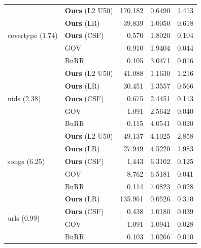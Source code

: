 \begin{tabular}{ll rrr}
  \midrule\multirow{5}{*}{covertype (1.74)} & \textbf{Ours} (L2 U50) & 170.182 & 0.6490 & 1.413 \\
                                            &     \textbf{Ours} (LR) &  39.839 & 1.0050 & 0.618 \\
                                            &    \textbf{Ours} (CSF) &   0.570 & 1.8020 & 0.104 \\
                                            &                    GOV &   0.910 & 1.9404 & 0.044 \\
                                            &                   BuRR &   0.105 & 3.0471 & 0.016 \\
       \midrule\multirow{5}{*}{nids (2.38)} & \textbf{Ours} (L2 U50) &  41.088 & 1.1630 & 1.216 \\
                                            &     \textbf{Ours} (LR) &  30.451 & 1.3557 & 0.566 \\
                                            &    \textbf{Ours} (CSF) &   0.675 & 2.4451 & 0.113 \\
                                            &                    GOV &   1.091 & 2.5642 & 0.040 \\
                                            &                   BuRR &   0.115 & 4.0541 & 0.020 \\
      \midrule\multirow{5}{*}{songs (6.25)} & \textbf{Ours} (L2 U50) &  49.137 & 4.1025 & 2.858 \\
                                            &     \textbf{Ours} (LR) &  27.949 & 4.5220 & 1.983 \\
                                            &    \textbf{Ours} (CSF) &   1.443 & 6.3102 & 0.125 \\
                                            &                    GOV &   8.762 & 6.5181 & 0.041 \\
                                            &                   BuRR &   0.114 & 7.0823 & 0.028 \\
       \midrule\multirow{4}{*}{urls (0.99)} &     \textbf{Ours} (LR) & 135.961 & 0.0526 & 0.310 \\
                                            &    \textbf{Ours} (CSF) &   0.438 & 1.0180 & 0.039 \\
                                            &                    GOV &   1.091 & 1.0941 & 0.028 \\
                                            &                   BuRR &   0.103 & 1.0266 & 0.010 \\
              

\end{tabular}
